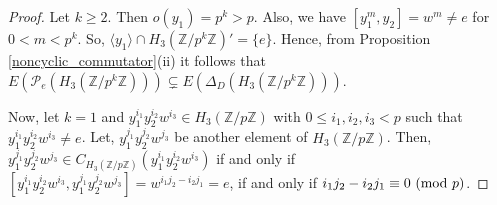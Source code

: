 \documentclass[12pt,a4paper]{article}
\begin{document}
\begin{proof}
Let $k\geq 2$. Then $o(y_1)=p^k>p$. Also, we have $[y_1^m,y_2]=w^m\neq e$ for $0<m<p^k$. So, $\langle y_1\rangle\cap H_3(\mathbb{Z}/p^k\mathbb{Z})'=\{e\}$. Hence, from Proposition \ref{noncyclic_commutator}(ii) it follows that $E(\mathcal{P}_e(H_3(\mathbb{Z}/p^k\mathbb{Z})))\subsetneq E(\Delta_D(H_3(\mathbb{Z}/p^k\mathbb{Z})))$.

Now, let $k=1$ and $y_1^{i_1}y_2^{i_2}w^{i_3}\in H_3(\mathbb{Z}/p\mathbb{Z})$ with $0\leq i_1,i_2,i_3<p$ such that $y_1^{i_1}y_2^{i_2}w^{i_3}\neq e$. Let, $y_1^{j_1}y_2^{j_2}w^{j_3}$ be another element of $H_3(\mathbb{Z}/p\mathbb{Z})$. Then, $y_1^{j_1}y_2^{j_2}w^{j_3}\in C_{H_3(\mathbb{Z}/p\mathbb{Z})}(y_1^{i_1}y_2^{i_2}w^{i_3})$ if and only if $[y_1^{i_1}y_2^{i_2}w^{i_3},y_1^{j_1}y_2^{j_2}w^{j_3}]=w^{i_1j_2-i_2j_1}=e$, if and only if $i_1j_2-i_2j_1\equiv 0~({\rm mod}~p)$. 


\end{proof}
\end{document}
